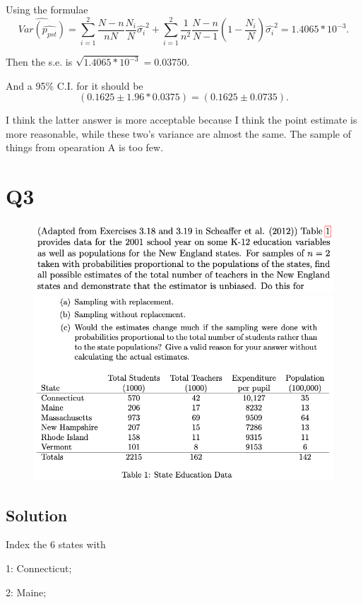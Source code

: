 \documentclass[12pt]{article}%
\begin{document}
Using the formulae 
$$\widehat{Var(\widehat{p_{pst}})}=\sum_{i=1}^{2}\frac{N-n}{nN}\frac{N_i}{N} \hat{\sigma_i}^2
+ \sum_{i=1}^2 \frac{1}{n^2}\frac{N-n}{N-1}(1-\frac{N_i}{N})\hat{\sigma_i}^2=1.4065*10^{-3}.$$

Then the s.e. is $\sqrt{1.4065*10^{-3}}=0.03750.$ 

And a 95\% C.I. for it should be $$(0.1625 \pm 1.96*0.0375) = (0.1625 \pm 0.0735).$$

I think the latter answer is more acceptable because I think the point estimate is more reasonable, 
while these two's variance are almost the same. The sample of things from opearation A is too few.


\newpage
\section{Q3}
\begin{figure}[htp]
    \includegraphics[width = 15cm]{img/Q3(1).png}
    \includegraphics[width = 15cm]{img/Q3(2).png}
\end{figure}
\subsection*{Solution}

Index the 6 states with 

1: Connecticut; 

2: Maine; 
\end{document}
